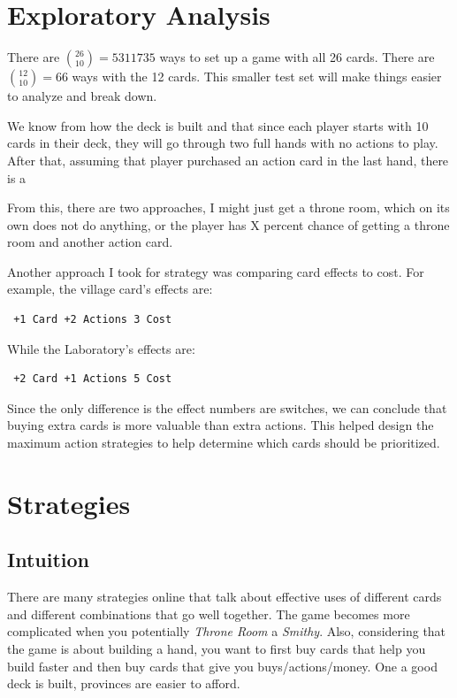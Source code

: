 \documentclass[11pt, oneside]{article}   	%
\begin{document}
\section{Exploratory Analysis}

There are $\binom{26}{10} = 5311735$ ways to set up a game with all 26 cards. \newline
\newline
There are $\binom{12}{10} = 66$ ways with the 12 cards. This smaller test set will make things easier to analyze and break down. \newline

We know from how the deck is built and that since each player starts with 10 cards in their deck, they will go through two full hands with no actions to play. After that, assuming that player purchased an action card in the last hand, there is a 

From this, there are two approaches, I might just get a throne room, which on its own does not do anything, or the player has  X percent chance of getting a throne room and another action card. 

Another approach I took for strategy was comparing card effects to cost. For example, the village card's effects are: \begin{verbatim} +1 Card +2 Actions 3 Cost \end{verbatim}  While the Laboratory's effects are: \begin{verbatim} +2 Card +1 Actions 5 Cost \end{verbatim}
Since the only difference is the effect numbers are switches, we can conclude that buying extra cards is more valuable than extra actions. This helped design the maximum action strategies to help determine which cards should be prioritized.



\section{Strategies}

\subsection{Intuition}

There are many strategies online that talk about effective uses of different cards and different combinations that go well together. The game becomes more complicated when you potentially \textit{Throne Room} a \textit{Smithy}. Also, considering that the game is about building a hand, you want to first buy cards that help you build faster and then buy cards that give you buys/actions/money. One a good deck is built, provinces are easier to afford. 
\end{document}
